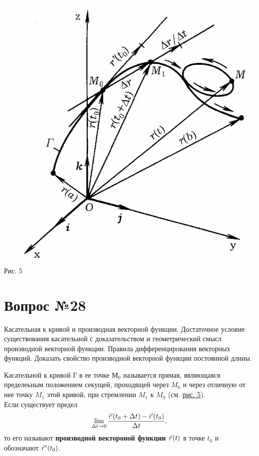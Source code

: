 \documentclass[12pt]{report}
\numberwithin{equation}{section}
\newcommand{\pvec}[1]{\vec{#1}\mkern2mu\vphantom{#1}}
\begin{document}
\begin{center}
\includegraphics[scale=0.4]{pic27_1.png} \label{pic:27:1}\\
Рис. 5
\end{center}

\newpage \section{Вопрос №28} %
\begin{framed}
Касательная к кривой и производная векторной функции. Достаточное условие существования касательной с доказательством и геометрический смысл производной векторной функции. Правила дифференцирования векторных функций. Доказать свойство производной векторной функции постоянной длины.
\end{framed}
Касательной к кривой Г в ее точке $М_0$ называется прямая, являющаяся пределеьным положением секущей, проходящей через $M_0$ и через отличную от нее точку $M_1$ этой кривой, при стремлении $M_1$ к $M_0$ (см. \hyperref[pic:27:1]{рис. 5}).\\

Если существует предел
\[ \lim_{\Delta t \to 0} \frac{\pvec{r}(t_0 + \Delta t) - \pvec{r}(t_0)}{\Delta t},\]
то его называют \textbf{производной вектороной функции} $\pvec{r}(t)$ в точке $t_0$ и обозначают $\pvec{r}'(t_0)$.
\end{document}
